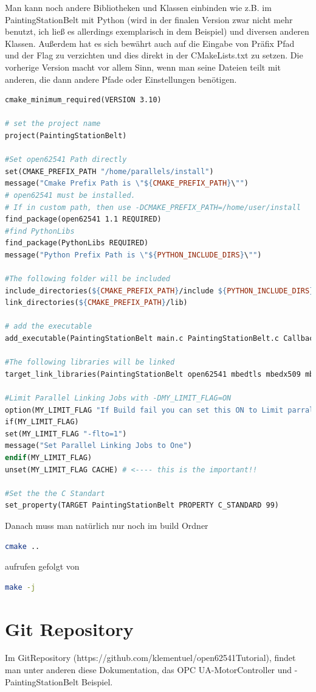 Man kann noch andere Bibliotheken und Klassen einbinden wie z.B. im PaintingStationBelt mit Python (wird in der finalen Version zwar nicht mehr benutzt, ich ließ es allerdings exemplarisch in dem Beispiel) und diversen anderen Klassen. Außerdem hat es sich bewährt auch auf die Eingabe von Präfix Pfad und der Flag zu verzichten und dies direkt in der CMakeLists.txt zu setzen. Die vorherige Version macht vor allem Sinn, wenn man seine Dateien teilt mit anderen, die dann andere Pfade oder Einstellungen benötigen.
\begin{lstlisting}[language=make]
cmake_minimum_required(VERSION 3.10)

# set the project name
project(PaintingStationBelt)

#Set open62541 Path directly
set(CMAKE_PREFIX_PATH "/home/parallels/install")
message("Cmake Prefix Path is \"${CMAKE_PREFIX_PATH}\"")
# open62541 must be installed.
# If in custom path, then use -DCMAKE_PREFIX_PATH=/home/user/install
find_package(open62541 1.1 REQUIRED)
#find PythonLibs
find_package(PythonLibs REQUIRED)
message("Python Prefix Path is \"${PYTHON_INCLUDE_DIRS}\"")

#The following folder will be included
include_directories(${CMAKE_PREFIX_PATH}/include ${PYTHON_INCLUDE_DIRS} PyhtonScripts)
link_directories(${CMAKE_PREFIX_PATH}/lib)

# add the executable
add_executable(PaintingStationBelt main.c PaintingStationBelt.c Callbacks.c OpcUaHelper.c KpiCalculator.c)

#The following libraries will be linked
target_link_libraries(PaintingStationBelt open62541 mbedtls mbedx509 mbedcrypto pthread ${PYTHON_LIBRARIES})

#Limit Parallel Linking Jobs with -DMY_LIMIT_FLAG=ON
option(MY_LIMIT_FLAG "If Build fail you can set this ON to Limit parralel Linking Jobs to One" OFF) #OFF by default
if(MY_LIMIT_FLAG)
set(MY_LIMIT_FLAG "-flto=1")
message("Set Parallel Linking Jobs to One")
endif(MY_LIMIT_FLAG)
unset(MY_LIMIT_FLAG CACHE) # <---- this is the important!!

#Set the the C Standart
set_property(TARGET PaintingStationBelt PROPERTY C_STANDARD 99)
\end{lstlisting}
Danach muss man natürlich nur noch im build Ordner 
\begin{lstlisting}[language=Bash]
cmake .. 
\end{lstlisting}

aufrufen gefolgt von 
\begin{lstlisting}[language=Bash]
make -j
\end{lstlisting}

\clearpage
\section{Git Repository}
Im GitRepository (https://github.com/klementuel/open62541Tutorial), findet man unter anderen diese Dokumentation, das OPC UA-MotorController und -PaintingStationBelt Beispiel.

